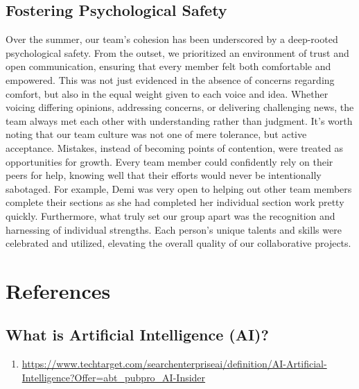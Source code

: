 \documentclass[
]{book}
\providecommand{\tightlist}{%
  \setlength{\itemsep}{0pt}\setlength{\parskip}{0pt}}
\begin{document}
\hypertarget{fostering-psychological-safety}{%
\section{Fostering Psychological Safety}\label{fostering-psychological-safety}}

Over the summer, our team's cohesion has been underscored by a deep-rooted psychological safety. From the outset, we prioritized an environment of trust and open communication, ensuring that every member felt both comfortable and empowered. This was not just evidenced in the absence of concerns regarding comfort, but also in the equal weight given to each voice and idea. Whether voicing differing opinions, addressing concerns, or delivering challenging news, the team always met each other with understanding rather than judgment. It's worth noting that our team culture was not one of mere tolerance, but active acceptance. Mistakes, instead of becoming points of contention, were treated as opportunities for growth. Every team member could confidently rely on their peers for help, knowing well that their efforts would never be intentionally sabotaged. For example, Demi was very open to helping out other team members complete their sections as she had completed her individual section work pretty quickly. Furthermore, what truly set our group apart was the recognition and harnessing of individual strengths. Each person's unique talents and skills were celebrated and utilized, elevating the overall quality of our collaborative projects.

\hypertarget{references}{%
\chapter{References}\label{references}}

\hypertarget{what-is-artificial-intelligence-ai-1}{%
\section{What is Artificial Intelligence (AI)?}\label{what-is-artificial-intelligence-ai-1}}

\begin{enumerate}
\def\labelenumi{(\arabic{enumi})}
\tightlist
\item
  \url{https://www.techtarget.com/searchenterpriseai/definition/AI-Artificial-Intelligence?Offer=abt_pubpro_AI-Insider}
\end{enumerate}
\end{document}
